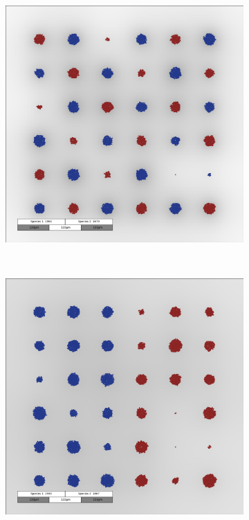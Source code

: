 \documentclass[10pt,A4paper]{article}
\numberwithin{equation}{section}
\begin{document}
\begin{figure}
\begin{subfigure}[c]{0.5\textwidth}
        \includegraphics[width=\textwidth]{Figures/abm-homogenous-low-diffusion/images/snapshot_00012000.png}
    \end{subfigure}\\
    \begin{subfigure}[c]{0.5\textwidth}
        \includegraphics[width=\textwidth]{Figures/abm-inhomogenous/images/snapshot_00012000.png}%

\end{subfigure}
\end{figure}
\end{document}

